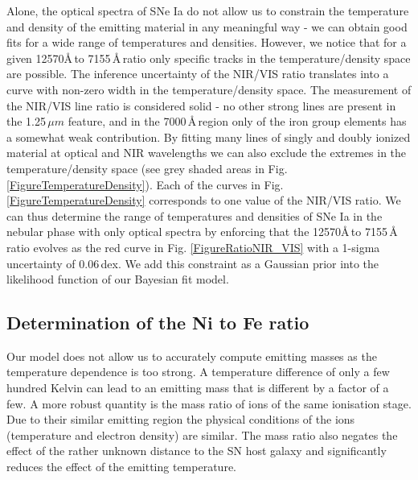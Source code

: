 \documentclass[fleqn,usenatbib]{mnras}
\begin{document}
Alone, the optical spectra of SNe Ia do not allow us to constrain the temperature and density of the emitting material in any meaningful way - we can obtain good fits for a wide range of temperatures and densities. However, we notice that for a given  12570\AA\,to 7155\,\AA\,ratio only specific tracks in the temperature/density space are possible. The inference uncertainty of the NIR/VIS ratio translates into a curve with non-zero width in the temperature/density space. The measurement of the NIR/VIS line ratio is considered solid - no other strong lines are present in the 1.25\,$\mu m$ feature, and in the 7000\,\AA\,region only  of the iron group elements has a somewhat weak contribution. By fitting many lines of singly and doubly ionized material at optical and NIR wavelengths we can also exclude the extremes in the temperature/density space (see grey shaded areas in Fig. \ref{FigureTemperatureDensity}). Each of the curves in Fig. \ref{FigureTemperatureDensity} corresponds to one value of the NIR/VIS ratio. We can thus determine the range of temperatures and densities of SNe Ia in the nebular phase with only optical spectra by enforcing that the  12570\AA\,to 7155\,\AA\,ratio evolves as the red curve in Fig. \ref{FigureRatioNIR_VIS} with a 1-sigma uncertainty of 0.06\,dex. We add this constraint as a Gaussian prior into the likelihood function of our Bayesian fit model. 

\subsection{Determination of the Ni to Fe ratio}
Our model does not allow us to accurately compute emitting masses as the temperature dependence is too strong. A temperature difference of only a few hundred Kelvin can lead to an emitting mass that is different by a factor of a few. A more robust quantity is the mass ratio of ions of the same ionisation stage. Due to their similar emitting region \citep{2018MNRAS.477.3567M,2018A&A...620A.200F} the physical conditions of the ions (temperature and electron density) are similar. The mass ratio also negates the effect of the rather unknown distance to the SN host galaxy and significantly reduces the effect of the emitting temperature. 

\end{document}
